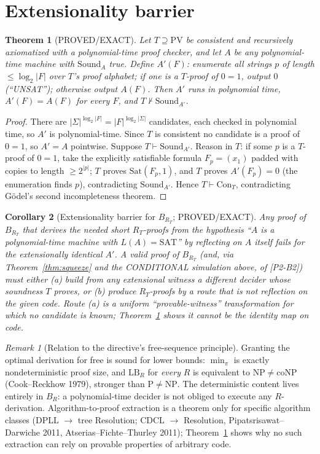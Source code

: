 \documentclass[11pt]{article}
\newtheorem{theorem}{Theorem}
\newtheorem{corollary}[theorem]{Corollary}
\theoremstyle{definition}
\theoremstyle{remark}
\newtheorem*{remark}{Remark}
\newcommand{\Sound}{\mathrm{Sound}}
\begin{document}
\section{Extensionality barrier}\label{sec:barrier}
\begin{theorem}[PROVED/EXACT]\label{thm:ext}
Let $T\supseteq\mathrm{PV}$ be consistent and recursively axiomatized with a polynomial-time proof checker,
and let $A$ be any polynomial-time machine with $\Sound_A$ true. Define $A'(F)$: enumerate all
strings $p$ of length $\le\log_2|F|$ over $T$'s proof alphabet; if one is a $T$-proof of $0=1$,
output $0$ (``UNSAT''); otherwise output $A(F)$. Then $A'$ runs in polynomial time,
$A'(F)=A(F)$ for every $F$, and $T\nvdash\Sound_{A'}$.
\end{theorem}
\begin{proof}
There are $|\Sigma|^{\log_2|F|}=|F|^{\log_2|\Sigma|}$ candidates, each checked in polynomial time, so
$A'$ is polynomial-time. Since $T$ is consistent no candidate is a proof of $0=1$, so $A'=A$ pointwise.
Suppose $T\vdash\Sound_{A'}$. Reason in $T$: if some $p$ is a $T$-proof of $0=1$, take the explicitly
satisfiable formula $F_p=(x_1)$ padded with copies to length $\ge2^{|p|}$; $T$ proves $\mathrm{Sat}(F_p,1)$,
and $T$ proves $A'(F_p)=0$ (the enumeration finds $p$), contradicting $\Sound_{A'}$. Hence
$T\vdash\mathrm{Con}_T$, contradicting G\"odel's second incompleteness theorem.
\end{proof}
\begin{corollary}[Extensionality barrier for $B_{R_T}$; PROVED/EXACT]\label{cor:ext}
Any proof of $B_{R_T}$ that derives the needed short $R_T$-proofs from the hypothesis
``$A$ is a polynomial-time machine with $L(A)=\mathrm{SAT}$'' by reflecting on $A$ itself fails for the
extensionally identical $A'$. A valid proof of $B_{R_T}$ (and, via Theorem~\ref{thm:squeeze} and the
CONDITIONAL simulation above, of [P2-B2]) must either (a) build from any extensional witness a
\emph{different} decider whose soundness $T$ proves, or (b) produce $R_T$-proofs by a route that is not
reflection on the given code. Route (a) is a uniform ``provable-witness'' transformation for which no
candidate is known; Theorem~\ref{thm:ext} shows it cannot be the identity map on code.
\end{corollary}
\begin{remark}[Relation to the directive's free-sequence principle]
Granting the optimal derivation for free is sound for lower bounds: $\min_\pi$ is exactly
nondeterministic proof size, and $\mathrm{LB}_R$ for \emph{every} $R$ is equivalent to
$\mathrm{NP}\ne\mathrm{coNP}$ (Cook--Reckhow 1979), stronger than $\mathrm P\ne\mathrm{NP}$.
The deterministic content lives entirely in $B_R$: a polynomial-time decider is not obliged to
execute any $R$-derivation. Algorithm-to-proof extraction is a theorem only for specific algorithm
classes (DPLL $\to$ tree Resolution; CDCL $\to$ Resolution, Pipatsrisawat--Darwiche 2011,
Atserias--Fichte--Thurley 2011); Theorem~\ref{thm:ext} shows why no such extraction can rely on
provable properties of arbitrary code.
\end{remark}
\end{document}
